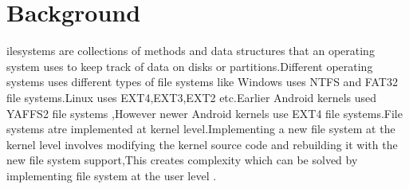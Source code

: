%
%
\let\textcircled=\pgftextcircled
\chapter{Background}
\label{chap:background}
ilesystems are collections of methods and data structures that an operating system uses to keep track of data on disks or partitions.Different operating systems uses different types of file systems like Windows uses NTFS and FAT32 file systems.Linux uses EXT4,EXT3,EXT2 etc.Earlier Android kernels used YAFFS2 file systems ,However newer Android kernels use EXT4 file systems.File systems atre implemented at kernel level.Implementing a new file system at the kernel level involves modifying the kernel source code and rebuilding it with the new file system support,This creates complexity which can be solved by implementing file system at the user level .
